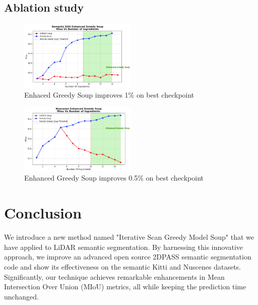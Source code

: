 \documentclass[10pt,twocolumn,letterpaper]{article}
\begin{document}
\subsection{Ablation study}
\begin{figure}[!htb]
    \centering
    \includegraphics[width=0.5\textwidth]{photos/semantickitti_soup.png}
    \caption{Enhaced Greedy Soup improves 1\% on best checkpoint }
\end{figure}
\begin{figure}[!htb]
    \centering
    \includegraphics[width=0.5\textwidth]{photos/nuscenes_soup.png}
    \caption{Enhanced Greedy Soup improves 0.5\% on best checkpoint }
\end{figure}
\section{Conclusion}
We introduce a new method named "Iterative Scan Greedy Model Soup" that we have applied to LiDAR semantic segmentation. By harnessing this innovative approach, we improve an advanced open source 2DPASS \cite{yan20222dpass} semantic segmentation code and show its effectiveness on the semantic Kitti and Nuscenes datasets. Significantly, our technique achieves remarkable enhancements in Mean Intersection Over Union (MIoU) metrics, all while keeping the prediction time unchanged.
\end{document}
